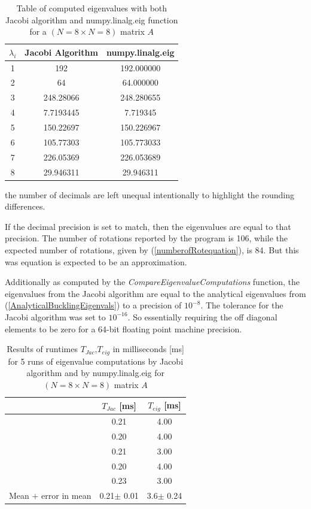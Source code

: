 \documentclass[aip,nobalancelastpage,
twocolumn,
rsi,%
 amsmath,amssymb,
 reprint,%
]{revtex4}
\begin{document}
\begin{table}[H]
\caption{Table of computed eigenvalues with both Jacobi algorithm and numpy.linalg.eig function for a $(N=8 \times N=8)$ matrix $A$}

\begin{tabular}{|c|c | c |}
\hline
$\lambda_i$ & Jacobi Algorithm & numpy.linalg.eig \\
\hline
1 & 192 & 192.000000 \\
\hline
2 & 64 & 64.000000 \\
\hline
3 & 248.28066 &  248.280655 \\
\hline
4 & 7.7193445  & 7.719345  \\
\hline
5 & 150.22697 & 150.226967 \\
\hline
6 & 105.77303  & 105.773033 \\
\hline
7 & 226.05369 & 226.053689 \\
\hline
8 & 29.946311 & 29.946311 \\
\hline
\end{tabular}
\label{part1: table 1}
\end{table}
\par
the number of decimals are left unequal intentionally to highlight the rounding differences.\par
If the decimal precision is set to match, then the eigenvalues are equal to that precision.
The number of rotations reported by the program is 106, while the expected number of rotations, given by 
(\ref{numberofRotequation}), is 84. But this was equation is expected to be an approximation.\par
Additionally as computed by the \textit{CompareEigenvalueComputations} function, the eigenvalues from the Jacobi algorithm are equal to the analytical eigenvalues from (\ref{AnalyticalBucklingEigenvals}) to a precision of $10^{-8}$. The tolerance for the Jacobi algorithm was set to $10^{-16}$. So essentially requiring the off diagonal elements to be zero for a 64-bit floating point machine precision.\par

\begin{table}[H]

\caption{Results of runtimes $T_{Jac}$,$T_{eig}$ in milliseconds [ms] for 5 runs of eigenvalue computations by Jacobi algorithm and by numpy.linalg.eig for $(N=8 \times N=8)$ matrix $A$}

\begin{tabular}{|c | c | c |}
\hline
 & $T_{Jac}$ [ms] & $T_{eig}$ [ms]  \\
\hline
\hline
 & 0.21 & 4.00\\
\hline
 & 0.20 & 4.00\\
\hline
 & 0.21 & 3.00\\
\hline
 & 0.20 & 4.00\\
\hline
 & 0.23 & 3.00\\
\hline
Mean $+$ error in mean & 0.21$\pm$ 0.01 & 3.6$\pm$ 0.24\\
\hline
\end{tabular}
\label{part 1: table 2}
\end{table}
\end{document}
